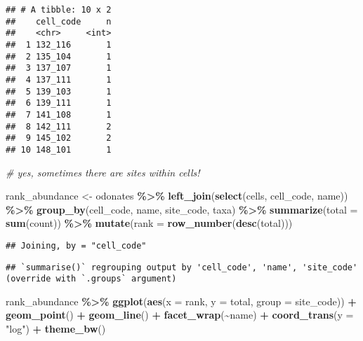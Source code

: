 \documentclass[
]{book}
\newenvironment{Shaded}{\begin{snugshade}}{\end{snugshade}}
\newcommand{\CommentTok}[1]{\textcolor[rgb]{0.56,0.35,0.01}{\textit{#1}}}
\newcommand{\DataTypeTok}[1]{\textcolor[rgb]{0.13,0.29,0.53}{#1}}
\newcommand{\KeywordTok}[1]{\textcolor[rgb]{0.13,0.29,0.53}{\textbf{#1}}}
\newcommand{\NormalTok}[1]{#1}
\newcommand{\OperatorTok}[1]{\textcolor[rgb]{0.81,0.36,0.00}{\textbf{#1}}}
\newcommand{\StringTok}[1]{\textcolor[rgb]{0.31,0.60,0.02}{#1}}
\begin{document}
\begin{verbatim}
## # A tibble: 10 x 2
##    cell_code     n
##    <chr>     <int>
##  1 132_116       1
##  2 135_104       1
##  3 137_107       1
##  4 137_111       1
##  5 139_103       1
##  6 139_111       1
##  7 141_108       1
##  8 142_111       2
##  9 145_102       2
## 10 148_101       1
\end{verbatim}

\begin{Shaded}
\begin{Highlighting}[]
\CommentTok{\# yes, sometimes there are sites within cells!}
\end{Highlighting}
\end{Shaded}

\begin{Shaded}
\begin{Highlighting}[]
\NormalTok{rank\_abundance \textless{}{-}}\StringTok{ }\NormalTok{odonates }\OperatorTok{\%\textgreater{}\%}\StringTok{ }
\StringTok{  }\KeywordTok{left\_join}\NormalTok{(}\KeywordTok{select}\NormalTok{(cells, cell\_code, name)) }\OperatorTok{\%\textgreater{}\%}\StringTok{ }
\StringTok{  }\KeywordTok{group\_by}\NormalTok{(cell\_code, name, site\_code, taxa) }\OperatorTok{\%\textgreater{}\%}\StringTok{ }
\StringTok{  }\KeywordTok{summarize}\NormalTok{(}\DataTypeTok{total =} \KeywordTok{sum}\NormalTok{(count)) }\OperatorTok{\%\textgreater{}\%}\StringTok{ }
\StringTok{  }\KeywordTok{mutate}\NormalTok{(}\DataTypeTok{rank =} \KeywordTok{row\_number}\NormalTok{(}\KeywordTok{desc}\NormalTok{(total)))}
\end{Highlighting}
\end{Shaded}

\begin{verbatim}
## Joining, by = "cell_code"
\end{verbatim}

\begin{verbatim}
## `summarise()` regrouping output by 'cell_code', 'name', 'site_code' (override with `.groups` argument)
\end{verbatim}

\begin{Shaded}
\begin{Highlighting}[]
\NormalTok{rank\_abundance }\OperatorTok{\%\textgreater{}\%}\StringTok{ }
\StringTok{  }\KeywordTok{ggplot}\NormalTok{(}\KeywordTok{aes}\NormalTok{(}\DataTypeTok{x =}\NormalTok{ rank, }\DataTypeTok{y =}\NormalTok{ total, }\DataTypeTok{group =}\NormalTok{ site\_code)) }\OperatorTok{+}\StringTok{ }
\StringTok{  }\KeywordTok{geom\_point}\NormalTok{() }\OperatorTok{+}\StringTok{ }
\StringTok{  }\KeywordTok{geom\_line}\NormalTok{() }\OperatorTok{+}\StringTok{ }
\StringTok{  }\KeywordTok{facet\_wrap}\NormalTok{(}\OperatorTok{\textasciitilde{}}\NormalTok{name) }\OperatorTok{+}\StringTok{ }
\StringTok{  }\KeywordTok{coord\_trans}\NormalTok{(}\DataTypeTok{y =} \StringTok{"log"}\NormalTok{) }\OperatorTok{+}\StringTok{ }
\StringTok{  }\KeywordTok{theme\_bw}\NormalTok{()}
\end{Highlighting}
\end{Shaded}
\end{document}
